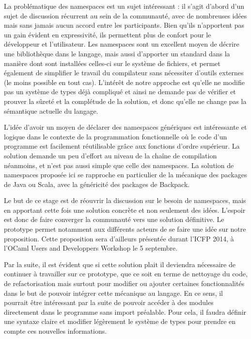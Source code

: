 \documentclass[11pt,a4paper]{report}
\begin{document}
La problématique des namespaces est un sujet intéressant : il s'agit d'abord
d'un sujet de discussion récurrent au sein de la communauté, avec de nombreuses
idées mais sans jamais aucun accord entre les participants. Bien qu'ils n'apportent
pas un gain évident en expressivité, ils permettent plus de confort pour le
développeur et l'utilisateur. Les namespaces sont un excellent moyen de décrire
une bibliothèque dans le langage, mais aussi d'apporter un standard dans la
manière dont sont installées celles-ci sur le système de fichiers, et permet
également de simplifier le travail du compilateur sans nécessiter d'outils
externes (le moins possible en tout cas). L'intérêt de notre approche est
qu'elle ne modifie pas un système de types déjà compliqué et ainsi ne demande
pas de vérifier et prouver la sûreté et la complétude de la solution, et donc
qu'elle ne change pas la sémantique actuelle du langage.

L'idée d'avoir un moyen de déclarer des namespaces génériques est intéressante
et logique dans le contexte de la programmation fonctionnelle où le code d'un
programme est facilement réutilisable grâce aux fonctions d'ordre supérieur. La
solution demande un peu d'effort au niveau de la chaîne de compilation
néanmoins, et n'est pas aussi simple que celle des namespaces. La solution de
namespaces proposée ici se rapproche en particulier de la mécanique des packages
de Java ou Scala, avec la généricité des packages de Backpack.

Le but de ce stage est de réouvrir la discussion sur le besoin de namespaces,
mais en apportant cette fois une solution concrète et non seulement des
idées. L'espoir est donc de faire converger la communauté vers une solution
définitive. Le prototype permet notamment aux différents acteurs de se faire une
idée sur notre proposition. Cette proposition sera d'ailleurs présentée durant
l'ICFP 2014, à l'OCaml Users and Developpers Workshop le 5 septembre.

Par la suite, il est évident que si cette solution plait il deviendra nécessaire
de continuer à travailler sur ce prototype, que ce soit en terme de nettoyage du
code, de refactorisation mais surtout pour modifier ou ajouter certaines
fonctionnalités dans le but de pouvoir intégrer cette mécanique au langage. En
ce sens, il pourrait être intéressant par la suite de pouvoir accéder à des
modules directement dans le programme sans import préalable. Pour cela, il
faudra définir une syntaxe claire et modifier légèrement le système de types
pour prendre en compte ces nouvelles informations.
\end{document}

